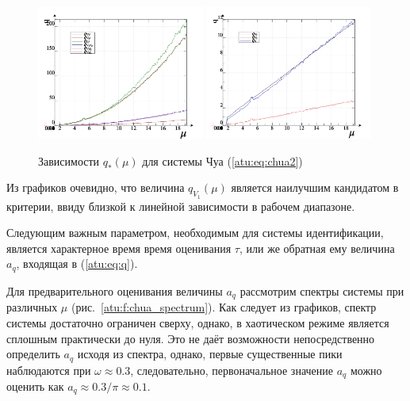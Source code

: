 \begin{figure}[htb!]
\centerline{
  \includegraphics[width=0.49\textwidth]{p/cha/chua/chua_q-p_mu2.png}
  \includegraphics[width=0.49\textwidth]{p/cha/chua/chua_q-p_mu1.png}
}
  \caption{Зависимости $q_{*}(\mu) $ для системы Чуа (\ref{atu:eq:chua2})}
\label{atu:f:chua_q}
\end{figure}

Из графиков очевидно, что величина $ q_{V_1}(\mu) $
является наилучшим кандидатом в критерии, ввиду близкой к линейной зависимости
в рабочем диапазоне.

Следующим важным параметром, необходимым для системы идентификации, является
характерное время время оценивания $\tau$, или же обратная ему величина $a_q$,
входящая в (\ref{atu:eq:q}).

Для предварительного оценивания величины $a_q$ рассмотрим спектры системы при различных
$\mu$ (рис.~\ref{atu:f:chua_spectrum}). Как следует из графиков, спектр системы достаточно
ограничен сверху, однако, в хаотическом режиме является сплошным практически до нуля.
Это не даёт возможности непосредственно определить $a_q$ исходя из спектра,
однако, первые существенные пики наблюдаются при $ \omega \approx 0.3 $, следовательно,
первоначальное значение $a_q$ можно оценить как $ a_q \approx 0.3 / \pi \approx 0.1 $.


